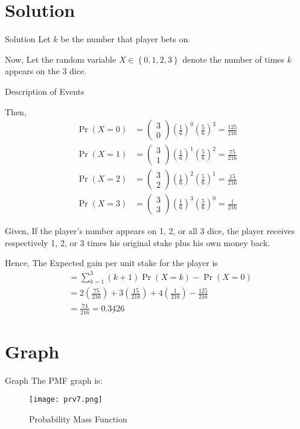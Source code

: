 \documentclass{beamer}
\newcommand{\myvec}[1]{\ensuremath{\begin{pmatrix}#1\end{pmatrix}}}
\providecommand{\pr}[1]{\ensuremath{\Pr\left(#1\right)}}
\providecommand{\cbrak}[1]{\ensuremath{\left\{#1\right\}}}
\providecommand{\brak}[1]{\ensuremath{\left(#1\right)}}
\begin{document}
\section{Solution}
\begin{frame}[allowframebreaks]{Solution}
    Let $k$ be the number that player bets on.
    
    Now, Let the random variable $X \in \cbrak{0,1,2,3}$ denote the number of times $k$ appears on the 3 dice.
    \begin{table}[ht!]
        
        \caption{Description of Events}
	    \label{Tables:Table}
    \end{table}
    Then,
    \begin{align}
        \pr{X = 0} &= \myvec{3\\0} \brak{\frac{1}{6}}^0 \brak{\frac{5}{6}}^3 = \frac{125}{216}\\
        \pr{X = 1} &= \myvec{3\\1} \brak{\frac{1}{6}}^1 \brak{\frac{5}{6}}^2 = \frac{75}{216}\\
        \pr{X = 2} &= \myvec{3\\2} \brak{\frac{1}{6}}^2 \brak{\frac{5}{6}}^1 = \frac{15}{216}\\
        \pr{X = 3} &= \myvec{3\\3} \brak{\frac{1}{6}}^3 \brak{\frac{5}{6}}^0 = \frac{1}{216}
    \end{align}
    
    Given, If the player's number appears on 1, 2, or all 3 dice, the player receives respectively 1, 2, or 3 times his original stake plus his own money back. 
    
    Hence, The Expected gain per unit stake for the player is
    \begin{align}
        &= \sum_{k=1}^3 (k+1) \pr{X = k} - \pr{X = 0}\\
        &= 2\brak{\frac{75}{216}} + 3\brak{\frac{15}{216}} + 4\brak{\frac{1}{216}} - \frac{125}{216}\\
        &= \frac{74}{216} = \underline{0.3426}
    \end{align}
   
    
\end{frame} 

\section{Graph}
\begin{frame}{Graph} 
    The PMF graph is:
    \begin{figure}[!ht]
		\centering
		\texttt{[image: prv7.png]}
		\caption{Probability Mass Function}
		\label{fig1}
	\end{figure}
    
\end{frame} 
\end{document}
